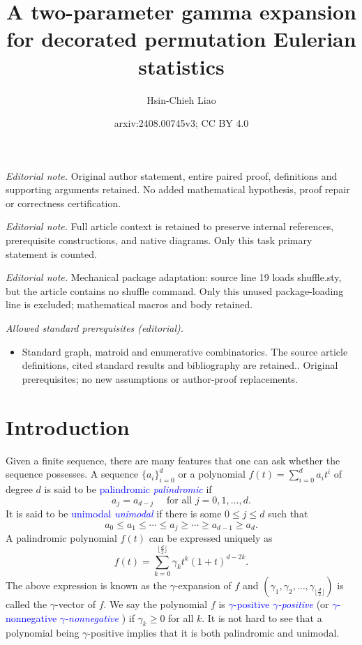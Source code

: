 \documentclass[reqno]{amsart}
\title{A two-parameter gamma expansion for decorated permutation Eulerian statistics}
\author{Hsin-Chieh Liao}
\date{arxiv:2408.00745v3; CC BY 4.0}
\newcommand{\defin}[1]{%
\relax\ifmmode%
\textcolor{blue}{#1}%
\else\textcolor{blue}{\emph{#1}}%
\fi%
}
\theoremstyle{definition}
\theoremstyle{remark}
\begin{document}
\maketitle
\noindent\textit{Editorial note.} Original author statement, entire paired proof, definitions and supporting arguments retained. No added mathematical hypothesis, proof repair or correctness certification.\par\medskip
\noindent\textit{Editorial note.} Full article context is retained to preserve internal references, prerequisite constructions, and native diagrams. Only this task primary statement is counted.\par\medskip
\noindent\textit{Editorial note.} Mechanical package adaptation: source line 19 loads shuffle.sty, but the article contains no shuffle command. Only this unused package-loading line is excluded; mathematical macros and body retained.\par\medskip
\noindent\textit{Allowed standard prerequisites (editorial).}\begin{itemize}
\item Standard graph, matroid and enumerative combinatorics. The source article definitions, cited standard results and bibliography are retained.. Original prerequisites; no new assumptions or author-proof replacements.
\end{itemize}\medskip
\section{Introduction}
Given a finite sequence, there are many features that one can ask whether the sequence possesses. A sequence $\{a_i\}_{i=0}^d$ or a polynomial $f(t)=\sum_{i=0}^d a_i t^i$ of degree $d$ is said to be \defin{palindromic} if 
\[
    a_j=a_{d-j}\quad \text{ for all } j=0,1,\ldots, d.
\]
It is said to be \defin{unimodal} if there is some $0\le j\le d$ such that 
\[
    a_0\le a_1\le\cdots\le a_j\ge\cdots\ge a_{d-1}\ge a_d.
\]
A palindromic polynomial $f(t)$ can be expressed uniquely as 
\[
    f(t)=\sum_{k=0}^{\lfloor\frac{d}{2}\rfloor}\gamma_{k}t^k(1+t)^{d-2k}.
\]
The above expression is known as the $\gamma$-expansion of $f$ and $(\gamma_1,\gamma_2,\ldots, \gamma_{\lfloor\frac{d}{2}\rfloor})$ is called the $\gamma$-vector of $f$.
We say the polynomial $f$ is \defin{$\gamma$-positive} (or \defin{$\gamma$-nonnegative}) if $\gamma_k\ge 0$ for all $k$. 
It is not hard to see that a polynomial being $\gamma$-positive implies that it is both palindromic and unimodal. 
\end{document}
